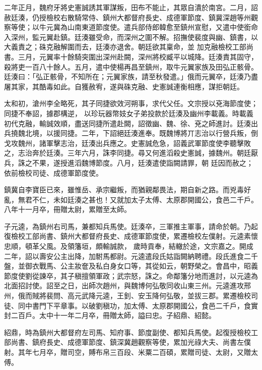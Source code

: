 \begin{pinyinscope}
 二年正月，魏府牙將史憲誠誘其軍謀叛，田布不能止，其眾自潰於南宮。二月，詔赦廷湊，仍授檢校右散騎常侍、鎮州大都督府長史、成德軍節度、鎮冀深趙等州觀察等使；以牛元冀為山南東道節度使。遣兵部侍郎韓愈至鎮州宣慰，又遣中使銜命入深州，監元翼赴鎮。廷湊雖受命，而深州之圍不解。招撫使裴度與幽、鎮書，以大義責之；硃克融解圍而去，廷湊亦退舍。朝廷欲其稟命，並
 加克融檢校工部尚書。三月，元翼率十餘騎突圍出深州赴闕，深州將校臧平以城降。廷湊責其固守，殺將吏一百八十餘人。五月，遣中使楊再昌至鎮州，取牛元翼家族及田弘正骸骨。廷湊曰：「弘正骸骨，不知所在；元翼家族，請至秋發遣。」俄而元翼卒，廷湊乃盡屠其家，其酷毒如此。自獲赦宥，遂與硃克融、史憲誠連衡相應，謀拒朝廷。



 太和初，滄州李全略死，其子同捷欲效河朔事，求代父任。文宗授以兗海節度使；同捷不奉詔，據郡構逆，
 以珍玩器幣妓女子弟投款於廷湊及幽州李載義。時載義初代克融，輸誠效順，盡送同捷所遣赴闕，詔徵幽、魏、徐、兗之師進討。廷湊出兵撓魏北境，以援同捷。二年，下詔絕廷湊進奉。既魏博將丌志治以行營兵叛，倒戈攻魏州，諸軍擊志治，廷湊出兵應之。史憲誠危急，詔義武軍節度使李聽擊敗之，志治奔於廷湊。三年六月，誅李同捷。尋又何進滔殺史憲誠，據魏州。朝廷厭兵，誅之不果，遂授進滔魏博節度。八月，廷湊遣使詣闕請罪，朝
 廷因而赦之；依前檢校司徒、成德軍節度使。



 鎮冀自李寶臣已來，雖惟岳、承宗繼叛，而猶親鄰畏法，期自新之路。而兇毒好亂，無君不仁，未如廷湊之甚也！又就加太子太傅、太原郡開國公，食邑二千戶。八年十一月卒，冊贈太尉，累贈至太師。



 子元逵，為鎮州右司馬，兼都知兵馬使。廷湊卒，三軍推主軍事，請命於朝。乃起復檢校工部尚書、鎮州大都督府長史、成德軍節度使，累遷檢校左僕射。元逵素懷忠順，頓革父風。及領籓垣，頗輸誠款，
 歲時貢奉，結轍於途，文宗嘉之。開成二年，詔以壽安公主出降，加駙馬都尉。元逵遣段氏姑詣闕納聘禮。段氏進食二千盤，並御衣戰馬、公主妝奩及私白身女口等，其從如云，朝野榮之。會昌中，昭義節度使劉從諫卒，其子稹擅領軍政；武宗怒，誅之。命鄰籓分地而進討，以元逵為北面招討使。詔至之日，出師次趙州，與魏博何弘敬同收山東三州。元逵進攻邢州，俄而賊將裴問、高元武降元逵，王釗、安玉降何弘敬，並拔三郡。累遷檢校司
 徒、同中書門下平章事。以破劉稹功，加太傅、太原郡開國公，食邑二千戶，食實封二百戶。太中十一年二月卒，冊贈太師，謚曰忠。子紹鼎、紹懿。



 紹鼎，時為鎮州大都督府左司馬、知府事、節度副使、都知兵馬使。起復授檢校工部尚書、鎮府長史、成德軍節度、鎮深冀趙觀察等使，累加光祿大夫、尚書左僕射。其年七月卒，贈司空，賻布帛三百段、米粟二百碩，累贈司徒、太尉，又贈太傅。




\end{pinyinscope}
